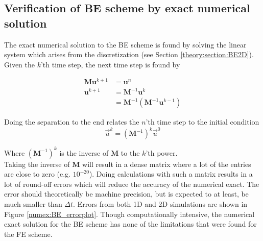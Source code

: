 \subsection{Verification of BE scheme by exact numerical solution}

The exact numerical solution to the BE scheme is found by solving the linear system which arises from the discretization (see Section \ref{theory:section:BE2D}). 
Given the $k$'th time step, the next time step is found by

\begin{align*}
 \mathbf M \mathbf u^{k+1} &= \mathbf{u}^n \\
 \mathbf{u}^{k+1} &= \mathbf{M}^{-1} \mathbf{u}^k \\
 &= \mathbf{M}^{-1}\left(\mathbf{M}^{-1} \mathbf{u}^{k-1}\right)
\end{align*}

\noindent Doing the separation to the end relates the $n$'th time step to the initial condition
\begin{equation}\label{BE_numex}
 \vec u^{k} = \left(\mathbf M^{-1}\right)^{k} \vec u^0
\end{equation}

\noindent Where $\left(\mathbf M^{-1}\right)^{k}$ is the inverse of $\mathbf M$ to the $k$'th power.\\

\noindent Taking the inverse of $\mathbf M$ will result in a dense matrix where a lot of the entries are close to zero (e.g. $10^{-20}$). 
Doing calculations with such a matrix results in a lot of round-off errors which will reduce the accuracy of the numerical exact. 
The error should theoretically be machine precision, but is expected to at least, be much smaller than $\Delta t$. 
Errors from both 1D and 2D simulations are shown in Figure \ref{numex:BE_errorplot}. 
Though computationally intensive, the numerical exact solution for the BE scheme has none of the limitations that were found for the FE scheme. 

